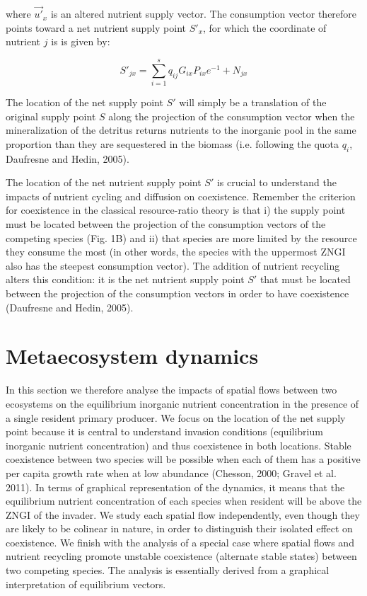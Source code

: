 \documentclass[letterpaper,twocolumn,showkeys]{revtex4-1}
\begin{document}
where $\overrightarrow{u'}_{x}$ is an altered nutrient supply vector. The consumption vector therefore points toward a net nutrient supply point $S'_{x}$, for which the coordinate of nutrient $j$ is is given by:

\begin{equation}
	\label{e:bnet}
	S'_{jx}=\sum_{i=1}^{s}q_{ij}G_{ix}P_{ix}e^{-1}+N_{jx}
\end{equation}

The location of the net supply point $S'$ will simply be a translation of the original supply point $S$ along the projection of the consumption vector when the mineralization of the detritus returns nutrients to the inorganic pool in the same proportion than they are sequestered in the biomass (i.e. following the quota $q_{i}$, Daufresne and Hedin, 2005). 

	The location of the net nutrient supply point $S'$ is crucial to understand the impacts of nutrient cycling and diffusion on coexistence. Remember the criterion for coexistence in the classical resource-ratio theory is that i) the supply point must be located between the projection of the consumption vectors of the competing species (Fig. 1B) and ii) that species are more limited by the resource they consume the most (in other words, the species with the uppermost ZNGI also has the steepest consumption vector). The addition of nutrient recycling alters this condition: it is the net nutrient supply point $S'$ that must be located between the projection of the consumption vectors in order to have coexistence (Daufresne and Hedin, 2005). 

\section{Metaecosystem dynamics}

 In this section we therefore analyse the impacts of spatial flows between two ecosystems on the equilibrium inorganic nutrient concentration in the presence of a single resident primary producer. We focus on the location of the net supply point because it is central to understand invasion conditions (equilibrium inorganic nutrient concentration) and thus coexistence in both locations. Stable coexistence between two species will be possible when each of them has a positive per capita growth rate when at low abundance (Chesson, 2000; Gravel et al. 2011). In terms of graphical representation of the dynamics, it means that the equilibrium nutrient concentration of each species when resident will be above the ZNGI of the invader. We study each spatial flow independently, even though they are likely to be colinear in nature, in order to distinguish their isolated effect on coexistence. We finish with the analysis of a special case where spatial flows and nutrient recycling promote unstable coexistence (alternate stable states) between two competing species. The analysis is essentially derived from a graphical interpretation of equilibrium vectors.
\end{document}
